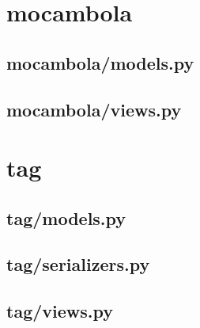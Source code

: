 \section{mocambola}

\subsection{mocambola/models.py}


%

\subsection{mocambola/views.py}




\section{tag}

\subsection{tag/models.py}


\subsection{tag/serializers.py}


\subsection{tag/views.py}


%

